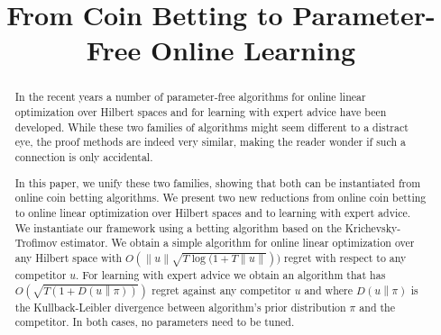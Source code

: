 \documentclass[anon]{colt2016} %
\title{From Coin Betting to Parameter-Free Online Learning}
\newcommand{\KL}[2]{D\left({#1}\middle\|{#2}\right)}  %
\newcommand{\norm}[1]{\left\|{#1}\right\|}
\begin{document}
\maketitle

\begin{abstract}
In the recent years a number of parameter-free algorithms for online linear
optimization over Hilbert spaces and for learning with expert advice have been
developed. While these two families of algorithms might seem different to a
distract eye, the proof methods are indeed very similar, making the reader
wonder if such a connection is only accidental.

In this paper, we unify these two families, showing that both can be
instantiated from online coin betting algorithms. We present two new reductions
from online coin betting to online linear optimization over Hilbert spaces and
to learning with expert advice. We instantiate our framework using a betting
algorithm based on the Krichevsky-Trofimov estimator. We obtain a simple
algorithm for online linear optimization over any Hilbert space with
$O(\norm{u}\sqrt{T \log(1+T \norm{u}}))$ regret with respect to any competitor $u$. For
learning with expert advice we obtain an algorithm that has $O(\sqrt{T (1 +
\KL{u}{\pi})})$ regret against any competitor $u$ and where $\KL{u}{\pi}$ is the
Kullback-Leibler divergence between algorithm's prior distribution $\pi$ and the
competitor. In both cases, no parameters need to be tuned.
\end{abstract}












\appendix




\end{document}
